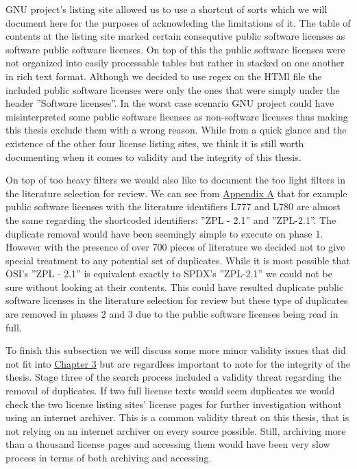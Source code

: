 GNU project's listing site allowed us to use a shortcut of sorts which we will document here for the purposes of acknowleding the limitations of it. The table of contents at the listing site marked certain consequtive public software licenses as software public software licenses. On top of this the public software licenses were not organized into easily processable tables but rather in stacked on one another in rich text format. Although we decided to use regex on the HTMl file the included public software licenses were only the ones that were simply under the header ''Software licenses''. In the worst case scenario GNU project could have misinterpreted some public software licenses as non-software licenses thus making this thesis exclude them with a wrong reason. While from a quick glance and the existence of the other four license listing sites, we think it is still worth documenting when it comes to validity and the integrity of this thesis.

On top of too heavy filters we would also like to document the too light filters in the literature selection for review. We can see from \hyperref[appendix:a]{Appendix A} that for example public software licenses with the literature identifiers L777 and L780 are almost the same regarding the shortcoded identifiers: ''ZPL - 2.1'' and ''ZPL-2.1''. The duplicate removal would have been seemingly simple to execute on phase 1. However with the presence of over 700 pieces of literature we decided not to give special treatment to any potential set of duplicates. While it is most possible that OSI's ''ZPL - 2.1'' is equivalent exactly to SPDX's ''ZPL-2.1'' we could not be sure without looking at their contents. This could have resulted duplicate public software licenses in the literature selection for review but these type of duplicates are removed in phases 2 and 3 due to the public software licenses being read in full.

To finish this subsection we will discuss some more minor validity issues that did not fit into \hyperref[results]{Chapter 3} but are regardless important to note for the integrity of the thesis. Stage three of the search process included a validity threat regarding the removal of duplicates. If two full license texts would seem duplicates we would check the two license listing sites' license pages for further investigation without using an internet archiver. This is a common validity threat on this thesis, that is not relying on an internet archiver on every source possible. Still, archiving more than a thousand license pages and accessing them would have been very slow process in terms of both archiving and accessing.

